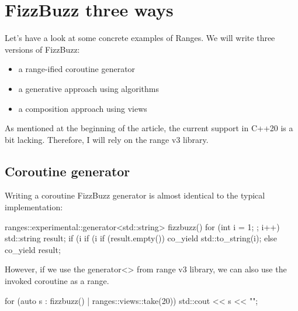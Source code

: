 \begin{box-note}
\end{box-note}

\section{FizzBuzz three ways}

Let’s have a look at some concrete examples of Ranges. We will write three versions of FizzBuzz:

\begin{itemize}
    \item a range-ified coroutine generator
    \item a generative approach using algorithms
    \item a composition approach using views
\end{itemize}

As mentioned at the beginning of the article, the current support in C++20 is a bit lacking. Therefore, I will rely on the range v3 library.

\subsection{Coroutine generator}

Writing a coroutine FizzBuzz generator is almost identical to the typical implementation:

\begin{box-note}
\begin{cppcode}
ranges::experimental::generator<std::string> fizzbuzz() {
    for (int i = 1; ; i++) {
        std::string result;
        if (i %
        if (i %
        if (result.empty()) co_yield std::to_string(i);
        else co_yield result;
    }
}
\end{cppcode}
\end{box-note}

However, if we use the generator<> from range v3 library, we can also use the invoked coroutine as a range.

\begin{box-note}
\begin{cppcode}
for (auto s : fizzbuzz() | ranges::views::take(20)) {
    std::cout << s << "\n";
}
\end{cppcode}
\end{box-note}

